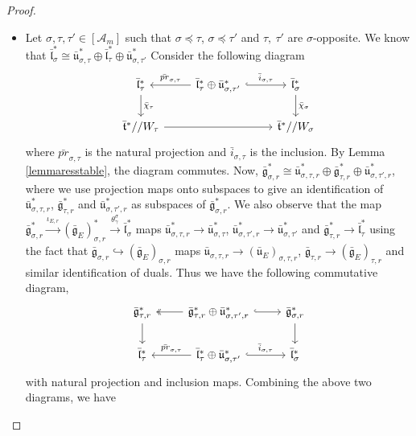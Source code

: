 \documentclass[11 pt]{article}
\numberwithin{equation}{subsection}
\theoremstyle{definition}
\theoremstyle{remark}
\theoremstyle{conjecture}
\newcommand{\sA}{\mathscr A}
\newcommand{\bt}{\bar{\mathfrak t}}
\newcommand{\bg}{\bar{\mathfrak g}}
\newcommand{\bu}{\bar{\mathfrak u}}
\newcommand{\bl}{\bar{\mathfrak l}}
\begin{document}
\begin{proof}
\begin{itemize}
        \item[(2)] Let $\sigma, \tau, \tau' \in [\sA_m]$ such that $\sigma\preceq \tau$, $\sigma\preceq \tau'$ and $\tau,\: \tau'$ are $\sigma$-opposite. We know that $\bl^*_\sigma\cong \bu^*_{\sigma,\tau} \oplus \bl_\tau^* \oplus \bu^*_{\sigma,\tau'}$ Consider the following diagram 
    \begin{equation*}
        \begin{tikzcd}
        \bl_\tau^* \arrow{d}{\bar\chi_\tau} & \bl_\tau^* \oplus \bu^*_{\sigma,\tau'} \arrow{l}[swap]{\bar{pr}_{\sigma,\tau}}\arrow[hookrightarrow]{r}{\bar i_{\sigma,\tau}} & \bl^*_\sigma \arrow{d}{\bar\chi_\sigma} \\
        \bt^* // W_\tau \arrow[rr] && \bt^* // W_\sigma
    \end{tikzcd}
    \end{equation*}
    where ${\bar{pr}_{\sigma,\tau}}$ is the natural projection and $\bar i_{\sigma,\tau}$ is the inclusion. By Lemma \ref{lemmaresstable}, the diagram commutes. Now, $\bg_{\sigma,r}^* \cong \bu_{\sigma,\tau,r}^* \oplus \bg_{\tau,r}^*\oplus \bu_{\sigma,\tau',r}^*$, where we use projection maps onto subspaces to give an identification of $\bu_{\sigma,\tau,r}^*$, $\bg_{\tau,r}^*$ and  $\bu_{\sigma,\tau',r}^*$  as subspaces of $\bg_{\sigma,r}^*$. We also observe that the map $\bg^*_{\sigma,r} \xrightarrow{\iota_{E,r}} (\bg_E)^*_{\sigma,r} \xrightarrow{\theta^\sigma_{\gamma}} \bl_\sigma^*$ maps $\bu_{\sigma,\tau,r}^* \rightarrow \bu_{\sigma,\tau}^*$, $\bu_{\sigma,\tau',r}^* \rightarrow \bu_{\sigma,\tau'}^*$ and $\bg_{\tau,r}^* \rightarrow \bl_\tau^*$ using the fact that $\bg_{\sigma,r} \hookrightarrow (\bg_E)_{\sigma,r}$ maps $\bu_{\sigma,\tau,r} \rightarrow (\bu_E)_{\sigma,\tau,r}$, $\bg_{\tau,r} \rightarrow (\bg_E)_{\tau,r}$ and similar identification of duals. Thus we have the following commutative diagram, 
    \begin{equation*}
      \begin{tikzcd}
        \bg_{\tau,r}^* \arrow{d} & \bg_{\tau,r}^* \oplus \bu^*_{\sigma,\tau',r} \arrow[twoheadrightarrow]{l}\arrow[hookrightarrow]{r} & \bg^*_{\sigma,r} \arrow{d}\\
        \bl_\tau^* &\bl_\tau^* \oplus \bu^*_{\sigma,\tau'} \arrow{l}[swap]{\bar{pr}_{\sigma,\tau}}\arrow[hookrightarrow]{r}{\bar i_{\sigma,\tau}}& \bl^*_\sigma
    \end{tikzcd}  
    \end{equation*}
    with natural projection and inclusion maps. Combining the above two diagrams, we have 

\end{itemize}
\end{proof}
\end{document}
